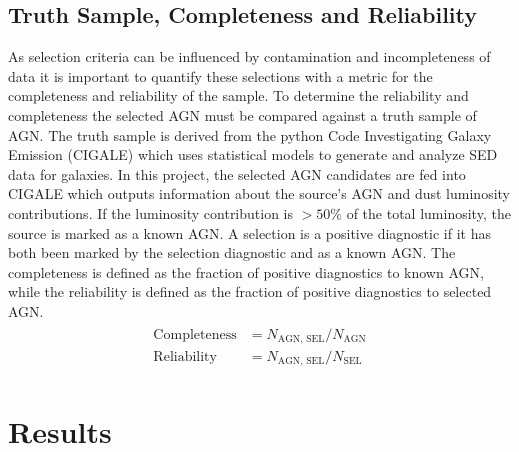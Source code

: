 \documentclass[12pt]{iopart}
\begin{document}
\subsection{Truth Sample, Completeness and Reliability}
As selection criteria can be influenced by contamination and incompleteness of data it is important to quantify these selections with a metric for the completeness and reliability of the sample. To determine the reliability and completeness the selected AGN must be compared against a truth sample of AGN. The truth sample is derived from the python Code Investigating Galaxy Emission (CIGALE) \cite{boquien_cigale_2019, yang_x-cigale_2020} which uses statistical models to generate and analyze SED data for galaxies. In this project, the selected AGN candidates are fed into CIGALE which outputs information about the source's AGN and dust luminosity contributions. If the luminosity contribution is $>50\%$ of the total luminosity, the source is marked as a known AGN. A selection is a positive diagnostic if it has both been marked by the selection diagnostic and as a known AGN. The completeness is defined as the fraction of positive diagnostics to known AGN, while the reliability is defined as the fraction of positive diagnostics to selected AGN. 
\begin{align*}
    \begin{split}
        \text{Completeness} &= N_{\text{AGN, SEL} }/N_{\text{AGN}}\\
        \text{Reliability} &= N_{\text{AGN, SEL} }/N_{\text{SEL}}
    \end{split}
\end{align*}
\section{Results}
\end{document}
